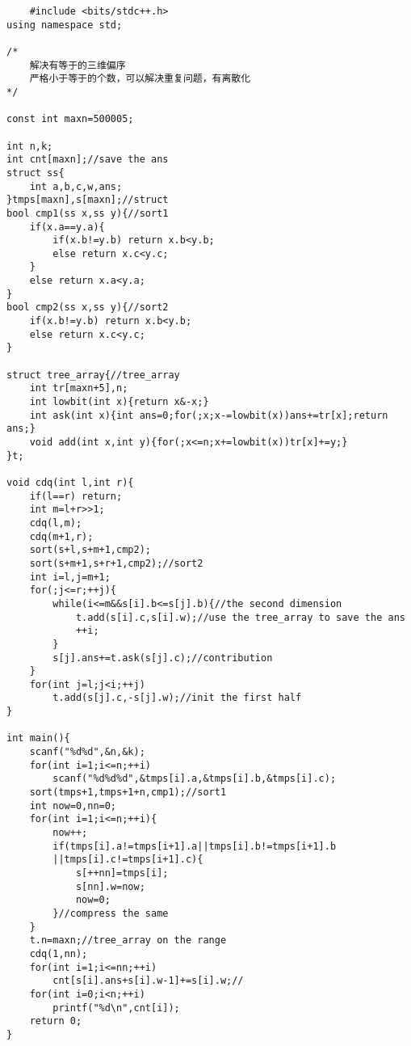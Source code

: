 \begin{lstlisting}
    #include <bits/stdc++.h>
using namespace std;

/*
    解决有等于的三维偏序
	严格小于等于的个数，可以解决重复问题，有离散化
*/

const int maxn=500005;

int n,k;
int cnt[maxn];//save the ans
struct ss{
	int a,b,c,w,ans;
}tmps[maxn],s[maxn];//struct
bool cmp1(ss x,ss y){//sort1
	if(x.a==y.a){
		if(x.b!=y.b) return x.b<y.b;
		else return x.c<y.c;
	}
	else return x.a<y.a;
}
bool cmp2(ss x,ss y){//sort2
	if(x.b!=y.b) return x.b<y.b;
	else return x.c<y.c;
}

struct tree_array{//tree_array
	int tr[maxn+5],n;
	int lowbit(int x){return x&-x;}
	int ask(int x){int ans=0;for(;x;x-=lowbit(x))ans+=tr[x];return ans;}
	void add(int x,int y){for(;x<=n;x+=lowbit(x))tr[x]+=y;}	
}t;

void cdq(int l,int r){
	if(l==r) return;
	int m=l+r>>1;
	cdq(l,m);
	cdq(m+1,r);
	sort(s+l,s+m+1,cmp2);
	sort(s+m+1,s+r+1,cmp2);//sort2
	int i=l,j=m+1;
	for(;j<=r;++j){
		while(i<=m&&s[i].b<=s[j].b){//the second dimension
			t.add(s[i].c,s[i].w);//use the tree_array to save the ans
			++i;
		}
		s[j].ans+=t.ask(s[j].c);//contribution
	}
	for(int j=l;j<i;++j)
		t.add(s[j].c,-s[j].w);//init the first half
}

int main(){
	scanf("%d%d",&n,&k);
	for(int i=1;i<=n;++i)
		scanf("%d%d%d",&tmps[i].a,&tmps[i].b,&tmps[i].c);
	sort(tmps+1,tmps+1+n,cmp1);//sort1
	int now=0,nn=0;
	for(int i=1;i<=n;++i){
		now++;
		if(tmps[i].a!=tmps[i+1].a||tmps[i].b!=tmps[i+1].b
		||tmps[i].c!=tmps[i+1].c){
			s[++nn]=tmps[i];
			s[nn].w=now;
			now=0;
		}//compress the same
	}
	t.n=maxn;//tree_array on the range
	cdq(1,nn);
	for(int i=1;i<=nn;++i)
		cnt[s[i].ans+s[i].w-1]+=s[i].w;//
	for(int i=0;i<n;++i)
		printf("%d\n",cnt[i]);
	return 0;
}
\end{lstlisting}